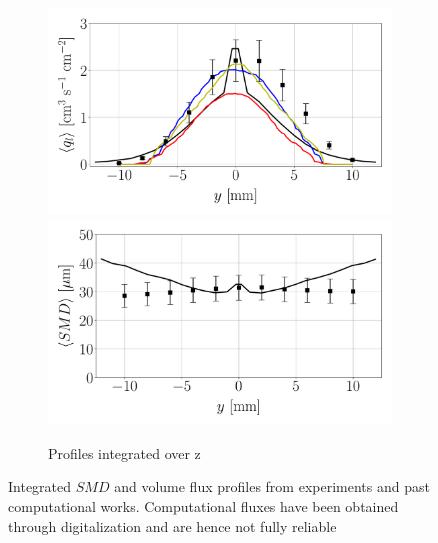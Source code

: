 \begin{figure}[h!]
\begin{subfigure}[b]{0.9\textwidth}
	\centering
   \includegraphics[scale=0.22]{./part2_developments/figures_ch6_lagrangian_JICF/previous_numerical_results/flux_profiles_along_y}
   \includegraphics[scale=0.22]{./part2_developments/figures_ch6_lagrangian_JICF/previous_numerical_results/SMD_profiles_along_y}
   \caption{Profiles integrated over z}
\end{subfigure}
\caption{Integrated $SMD$ and volume flux profiles from experiments and past computational works. Computational fluxes have been obtained through digitalization and are hence not fully reliable }
\label{fig:previous_works_profiles_comparison_with_expe}
\end{figure}


